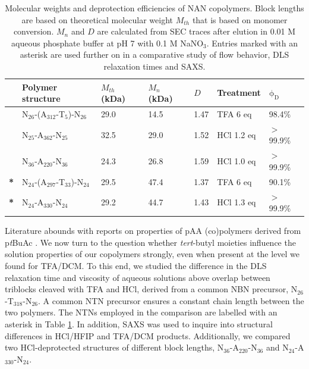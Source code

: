 \documentclass{article}
\begin{document}
\begin{table}
\centering
\caption{Molecular weights and deprotection efficiencies of NAN copolymers. 
Block lengths are based on theoretical molecular weight $M_{th}$ that is based on 
monomer conversion. 
$M_n$ and $D$ are calculated from SEC traces after elution in 
0.01 M aqueous phosphate buffer at pH 7 with 0.1 M NaNO$_3$. Entries marked with an 
asterisk are used further on in a comparative study of flow behavior, DLS relaxation times and SAXS.}
\begin{tabular}{lllllll}
\toprule
&Polymer structure 	&$M_{th}$ (kDa) & $M_{n}$  (kDa)&		$D$&		Treatment&	$\mathrm{\phi}_\mathrm{D}$\\
\midrule
&N$_\mathrm{26}$-(A$_\mathrm{312}$-T$_\mathrm{5}$)-N$_\mathrm{26}$	&	29.0	&	14.5		&	1.47		&TFA 6 eq	&	98.4\% \\
&N$_\mathrm{25}$-A$_\mathrm{362}$-N$_\mathrm{25}$							&	32.5	&	29.0	&	1.52	&HCl 1.2 eq&	$>$99.9\% \\
&N$_\mathrm{36}$-A$_\mathrm{220}$-N$_\mathrm{36}$			&	24.3	&	26.8		&	1.59	&HCl 1.0 eq 		&		$>$99.9\% \\
\textbf{*}&N$_\mathrm{24}$-(A$_\mathrm{297}$-T$_\mathrm{33}$)-N$_\mathrm{24}$	&	29.5	&	47.4		&	1.37		&TFA 6 eq	&	90.1\%	\\
\textbf{*}&N$_\mathrm{24}$-A$_\mathrm{330}$-N$_\mathrm{24}$							&	29.2	&	44.7		&	1.43		&HCl 1.3 eq&$>$99.9\%	\\
\bottomrule
\end{tabular}

\label{tab:results}
\end{table}

Literature abounds with reports on properties of pAA (co)polymers derived
from p\emph{t}BuAc \cite{Chen2013a, Maniego2017}. 
We now turn to the question whether \emph{tert}-butyl moieties influence the solution 
properties of our copolymers strongly, even when present at the level we found for TFA/DCM. To this 
end, we studied the difference in the DLS relaxation time and viscosity of aqueous solutions above 
overlap between triblocks cleaved with TFA and HCl, derived from a common NBN precursor, 
N$_\mathrm{26}$-T$_\mathrm{318}$-N$_\mathrm{26}$. A common NTN precursor ensures a constant 
chain length between the two polymers. The NTNs employed in the comparison are labelled with an asterisk in Table \ref{tab:results}.
In addition, SAXS was used to inquire into structural differences in HCl/HFIP and TFA/DCM products. Additionally,
we compared two HCl-deprotected structures of different block lengths, N$_\mathrm{36}$-A$_\mathrm{220}$-N$_\mathrm{36}$
and N$_\mathrm{24}$-A$_\mathrm{330}$-N$_\mathrm{24}$. 
\end{document}
